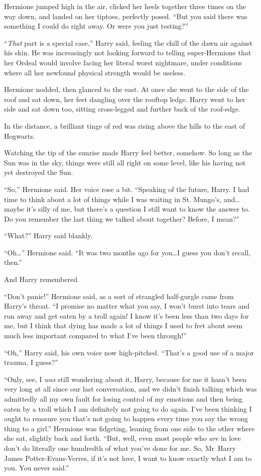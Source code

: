 Hermione jumped high in the air, clicked her heels together three times on the way down, and landed on her tiptoes, perfectly posed. “But you said there was something I could do right away. Or were you just testing?”

“\emph{That} part is a special case,” Harry said, feeling the chill of the dawn air against his skin. He was increasingly not looking forward to telling super-Hermione that her Ordeal would involve facing her literal worst nightmare, under conditions where all her newfound physical strength would be useless.

Hermione nodded, then glanced to the east. At once she went to the side of the roof and sat down, her feet dangling over the rooftop ledge. Harry went to her side and sat down too, sitting cross-legged and further back of the roof-edge.

In the distance, a brilliant tinge of red was rising above the hills to the east of Hogwarts.

Watching the tip of the sunrise made Harry feel better, somehow. So long as the Sun was in the sky, things were still all right on some level, like his having not yet destroyed the Sun.

“So,” Hermione said. Her voice rose a bit. “Speaking of the future, Harry. I had time to think about a lot of things while I was waiting in St. Mungo’s, and…maybe it’s silly of me, but there’s a question I still want to know the answer to. Do you remember the last thing we talked about together? Before, I mean?”

“What?” Harry said blankly.

“Oh…” Hermione said. “It was two months ago for you…I guess you don’t recall, then.”

And Harry remembered.

“Don’t panic!” Hermione said, as a sort of strangled half-gurgle came from Harry’s throat. “I promise no matter what you say, I won’t burst into tears and run away and get eaten by a troll again! I know it’s been less than two days for me, but I think that dying has made a lot of things I used to fret about seem much less important compared to what I’ve been through!”

“Oh,” Harry said, his own voice now high-pitched. “That’s a good use of a major trauma, I guess?”

“Only, see, I \emph{was} still wondering about it, Harry, because for me it hasn’t been very long at all since our last conversation, and we didn’t finish talking which was admittedly all my own fault for losing control of my emotions and then being eaten by a troll which I am definitely not going to do again. I’ve been thinking I ought to reassure you that’s not going to happen every time you say the wrong thing to a girl.” Hermione was fidgeting, leaning from one side to the other where she sat, slightly back and forth. “But, well, even most people who \emph{are} in love don’t do literally one hundredth of what you’ve done for me. So, Mr~Harry James Potter-Evans-Verres, if it’s not love, I want to know exactly what I am to you. You never said.”

